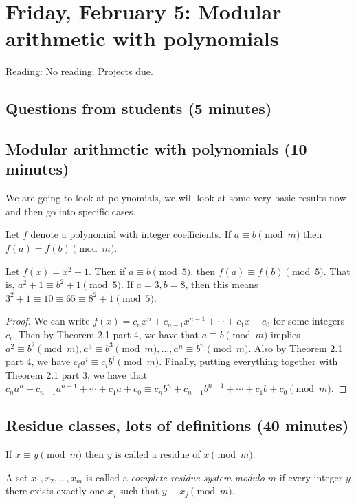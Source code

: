 \documentclass[letterpaper, 11 pt]{article}
\begin{document}
\section{Friday, February 5: Modular arithmetic with polynomials}
Reading: No reading. Projects due.

\subsection{Questions from students (5 minutes)}
\subsection{Modular arithmetic with polynomials (10 minutes)}
We are going to look at polynomials, we will look at some very basic results now and then go into specific cases.

\begin{lem}[Lemma 3.5]
 Let $f$ denote a polynomial with integer coefficients. If $a\equiv b \pmod m$ then $f(a)=f(b) \pmod m$.
\end{lem}

\begin{example}
 Let $f(x)=x^2+1$. Then if $a\equiv b\pmod 5$, then $f(a)\equiv f(b) \pmod 5$. That is, $a^2+1\equiv b^2 +1 \pmod 5$. If $a=3, b=8$, then this means $3^2+1\equiv 10\equiv 65 \equiv 8^2+1\pmod 5$.
\end{example}

\begin{proof}
 We can write $f(x)=c_nx^n+c_{n-1}x^{n-1}+\cdots+c_1x+c_0$ for some integers $c_i$. Then by Theorem 2.1 part 4, we have that $a\equiv b\pmod m$ implies $a^2\equiv b^2\pmod m, a^3\equiv b^3 \pmod m, \dots, a^n\equiv b^n\pmod m$. Also by Theorem 2.1 part 4, we have $c_i a^i\equiv c_i b^i \pmod m$. Finally, putting everything together with Theorem 2.1 part 3, we have that $c_na^n+c_{n-1}a^{n-1}+\cdots+c_1a+c_0\equiv c_nb^n+c_{n-1}b^{n-1}+\cdots+c_1b+c_0 \pmod m$.
\end{proof}

\subsection{Residue classes, lots of definitions (40 minutes)}

\begin{defn}
  If $x\equiv y \pmod{m}$ then $y$ is called a residue of $x\pmod{m}$. 
  
 A set $x_1,x_2,\dots, x_m$ is called a \emph{complete residue system modulo $m$} if every integer $y$ there exists exactly one $x_j$ such that $y\equiv x_j \pmod{m}$. 
 \end{defn}
 
\end{document}
